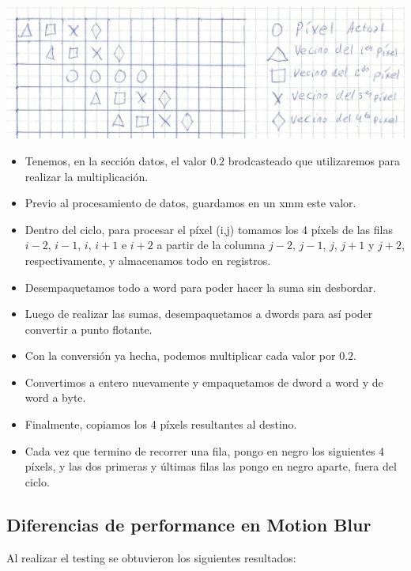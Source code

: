 \documentclass[a4paper]{article}
\begin{document}
\begin{center}
\includegraphics[scale=0.66]{Dibujos/MB1.jpg}
\end{center}

\begin{itemize}
\item  Tenemos, en la sección datos, el valor $0.2$ brodcasteado que utilizaremos para realizar la multiplicación.
\item  Previo al procesamiento de datos, guardamos en un xmm este valor.
\item  Dentro del ciclo, para procesar el píxel (i,j) tomamos los 4 píxels de las filas $i-2$, $i-1$, $i$, $i+1$ e $i+2$ a partir de la columna $j-2$, $j-1$, $j$, $j+1$ y $j+2$, respectivamente, y almacenamos todo en registros.
\item  Desempaquetamos todo a word para poder hacer la suma sin desbordar.
\item  Luego de realizar las sumas, desempaquetamos a dwords para así poder convertir a punto flotante.
\item  Con la conversión ya hecha, podemos multiplicar cada valor por $0.2$.
\item  Convertimos a entero nuevamente y empaquetamos de dword a word y de word a byte.
\item  Finalmente, copiamos los 4 píxels resultantes al destino. 
\item  Cada vez que termino de recorrer una fila, pongo en negro los siguientes 4 píxels, y las dos primeras y últimas filas las pongo en negro aparte, fuera del ciclo.
\end{itemize}

\subsection{Diferencias de performance en Motion Blur}

Al realizar el testing se obtuvieron los siguientes resultados:

\newpage
\end{document}
